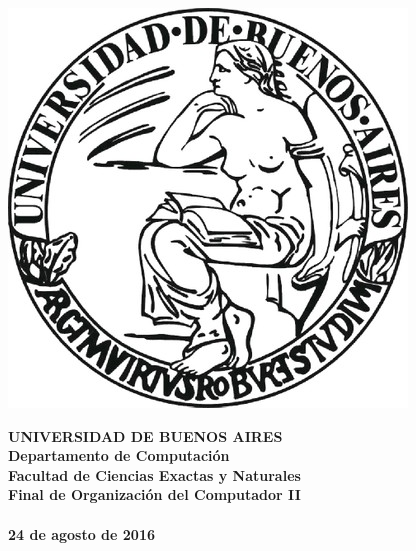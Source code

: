\documentclass[a4paper]{article}
\begin{document}

\def\Materia{Final de Organizaci\'on del Computador II}
\def\Fecha{24 de agosto de 2016}


\thispagestyle{empty}

\begin{center}
	\includegraphics[scale = 0.25]{logo_uba.jpg}
\end{center}

\vspace{5mm}

\begin{center}
	{\textbf{\large UNIVERSIDAD DE BUENOS AIRES}}\\[1.5em]
	{\textbf{\large Departamento de Computaci\'{o}n}}\\[1.5em]
    {\textbf{\large Facultad de Ciencias Exactas y Naturales}}\\
    \vspace{35mm}
    {\LARGE\textbf{\Materia}}\\[1em]    
    \vspace{15mm}
    {\Large \textbf{\Titulo}}\\[1em]
    \vspace{15mm}
    {\textbf{\Large \Fecha}}\\
    \vspace{15mm}
    \textbf{\tablaints}
\end{center}
\end{document}
